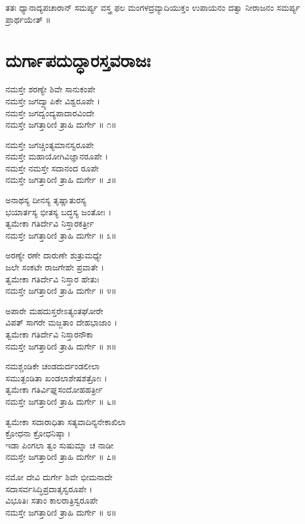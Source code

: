 ತತಃ ಧ್ಯಾನಾದ್ಯಪಚಾರಾನ್ ಸಮರ್ಪ್ಯ ವಸ್ತ್ರ ಫಲ ಮಂಗಳದ್ರವ್ಯಾದಿಯುಕ್ತಂ ಉಪಾಯನಂ ದತ್ವಾ ನೀರಾಜನಂ ಸಮರ್ಪ್ಯ ಪ್ರಾರ್ಥಯೇತ್ ॥
\newpage
\section{ದುರ್ಗಾಪದುದ್ಧಾರಸ್ತವರಾಜಃ}
ನಮಸ್ತೇ ಶರಣ್ಯೇ ಶಿವೇ ಸಾನುಕಂಪೇ\\ ನಮಸ್ತೇ ಜಗದ್ವ್ಯಾಪಿಕೇ ವಿಶ್ವರೂಪೇ ।\\
ನಮಸ್ತೇ ಜಗದ್ವಂದ್ಯಪಾದಾರವಿಂದೇ\\ ನಮಸ್ತೇ ಜಗತ್ತಾರಿಣಿ ತ್ರಾಹಿ ದುರ್ಗೇ ॥ ೧॥

ನಮಸ್ತೇ ಜಗಚ್ಚಿಂತ್ಯಮಾನಸ್ವರೂಪೇ\\ ನಮಸ್ತೇ ಮಹಾಯೋಗಿವಿಜ್ಞಾನರೂಪೇ ।\\
ನಮಸ್ತೇ ನಮಸ್ತೇ ಸದಾನಂದ ರೂಪೇ\\ ನಮಸ್ತೇ ಜಗತ್ತಾರಿಣಿ ತ್ರಾಹಿ ದುರ್ಗೇ ॥ ೨॥

ಅನಾಥಸ್ಯ ದೀನಸ್ಯ ತೃಷ್ಣಾತುರಸ್ಯ\\ ಭಯಾರ್ತಸ್ಯ ಭೀತಸ್ಯ ಬದ್ಧಸ್ಯ ಜಂತೋಃ ।\\
ತ್ವಮೇಕಾ ಗತಿರ್ದೇವಿ ನಿಸ್ತಾರಕರ್ತ್ರೀ\\ ನಮಸ್ತೇ ಜಗತ್ತಾರಿಣಿ ತ್ರಾಹಿ ದುರ್ಗೇ ॥ ೩॥

ಅರಣ್ಯೇ ರಣೇ ದಾರುಣೇ ಶುತ್ರುಮಧ್ಯೇ\\ ಜಲೇ ಸಂಕಟೇ ರಾಜಗೇಹೇ ಪ್ರವಾತೇ ।\\
ತ್ವಮೇಕಾ ಗತಿರ್ದೇವಿ ನಿಸ್ತಾರ ಹೇತುಃ\\ನಮಸ್ತೇ ಜಗತ್ತಾರಿಣಿ ತ್ರಾಹಿ ದುರ್ಗೇ ॥ ೪॥

ಅಪಾರೇ ಮಹದುಸ್ತರೇಽತ್ಯಂತಘೋರೇ\\ ವಿಪತ್ ಸಾಗರೇ ಮಜ್ಜತಾಂ ದೇಹಭಾಜಾಂ ।\\
ತ್ವಮೇಕಾ ಗತಿರ್ದೇವಿ ನಿಸ್ತಾರನೌಕಾ \\ನಮಸ್ತೇ ಜಗತ್ತಾರಿಣಿ ತ್ರಾಹಿ ದುರ್ಗೇ ॥ ೫॥

ನಮಶ್ಚಂಡಿಕೇ ಚಂಡದುರ್ದಂಡಲೀಲಾ\\ಸಮುತ್ಖಂಡಿತಾ ಖಂಡಲಾಶೇಷಶತ್ರೋಃ ।\\
ತ್ವಮೇಕಾ ಗತಿರ್ವಿಘ್ನಸಂದೋಹಹರ್ತ್ರೀ\\ ನಮಸ್ತೇ ಜಗತ್ತಾರಿಣಿ ತ್ರಾಹಿ ದುರ್ಗೇ ॥ ೬॥

ತ್ವಮೇಕಾ ಸದಾರಾಧಿತಾ ಸತ್ಯವಾದಿನ್ಯನೇಕಾಖಿಲಾ\\ ಕ್ರೋಧನಾ ಕ್ರೋಧನಿಷ್ಠಾ ।\\
ಇಡಾ ಪಿಂಗಲಾ ತ್ವಂ ಸುಷುಮ್ನಾ ಚ ನಾಡೀ\\  ನಮಸ್ತೇ ಜಗತ್ತಾರಿಣಿ ತ್ರಾಹಿ ದುರ್ಗೇ ॥ ೭॥

ನಮೋ ದೇವಿ ದುರ್ಗೇ ಶಿವೇ ಭೀಮನಾದೇ\\ ಸದಾಸರ್ವಸಿದ್ಧಿಪ್ರದಾತೃಸ್ವರೂಪೇ ।\\
ವಿಭೂತಿಃ ಸತಾಂ ಕಾಲರಾತ್ರಿಸ್ವರೂಪೇ\\ ನಮಸ್ತೇ ಜಗತ್ತಾರಿಣಿ ತ್ರಾಹಿ ದುರ್ಗೇ ॥ ೮॥

